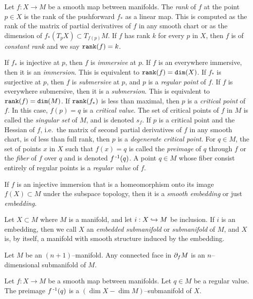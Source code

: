 \begin{defn}[Embedding]
	Let $f:X\to M$ be a smooth map between manifolds.
	The \emph{rank} of $f$ at the point $p\in X$ is the rank of the pushforward $f_*$ as a linear map.
	This is computed as the rank of the matrix of partial derivatives of $f$ in any smooth chart or as the dimension of $f_*(T_p X)\subset T_{f(p)} M$.
	If $f$ has rank $k$ for every $p$ in $X$, then $f$ is of \emph{constant rank} and we say $\texttt{rank}(f)=k$.
		
	If $f_*$ is injective at $p$, then $f$ is \emph{immersive} at $p$.
	If $f$ is an everywhere immersive, then it is an \emph{immersion}.
	This is equivalent to $\texttt{rank}(f)=\texttt{dim}(X)$.
	If $f_*$ is surjective at $p$, then $f$ is \emph{submersive} at $p$, and $p$ is a \emph{regular point} of $f$.
	If $f$ is everywhere submersive, then it is a \emph{submersion}.
	This is equivalent to $\texttt{rank}(f)=\texttt{dim}(M)$.
	If $\texttt{rank}(f_*)$ is less than maximal, then $p$ is a \emph{critical point} of $f$.
	In this case, $f(p)=q$ is a \emph{critical value}.
	The set of critical points of $f$ in $M$ is called the \emph{singular set} of $M$, and is denoted $s_f$.
	If $p$ is a critical point and the Hessian of $f$, i.e.\ the matrix of second partial derivatives of $f$ in any smooth chart, is of less than full rank, then $p$ is a \emph{degenerate critical point}.
	For $q\in M$, the set of points $x$ in $X$ such that $f(x)=q$ is called the \emph{preimage} of $q$ through $f$ or the \emph{fiber} of $f$ over $q$ and is denoted $f^{\,\text{-}1}(q)$.
	A point $q \in M$ whose fiber consist entirely of regular points is a \emph{regular value} of $f$.
	
	If $f$ is an injective immersion that is a homeomorphism onto its image $f(X)\subset M$ under the subspace topology, then it is a \emph{smooth embedding} or just \emph{embedding}.
	
	Let $X\subset M$ where $M$ is a manifold, and let $i:X\hookrightarrow M$ be inclusion.
	If $i$ is an embedding, then we call $X$ an \emph{embedded submanifold} or \emph{submanifold} of $M$, and $X$ is, by itself, a manifold with smooth structure induced by the embedding.
\end{defn}

\begin{prop}
	\label{prop:boundariesaremanifolds}
	Let $M$ be an $(n+1)$--manifold.
	Any connected face in $\partial_f M$ is an $n$--dimensional submanifold of $M$.
\end{prop}

\begin{theorem}
	Let $f:X\to M$ be a smooth map between manifolds.
	Let $q\in M$ be a regular value.
	The preimage $f^{\,\text{-}1}(q)$ is a $(\dim X-\dim M)$--submanifold of $X$.
\end{theorem}

